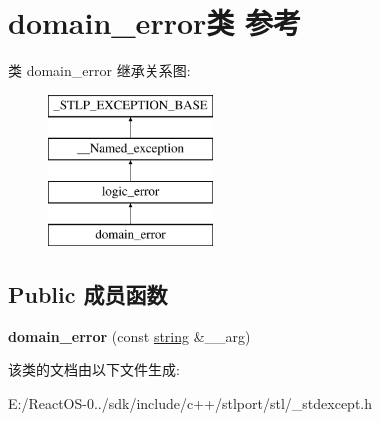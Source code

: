 \hypertarget{classdomain__error}{}\section{domain\+\_\+error类 参考}
\label{classdomain__error}
类 domain\+\_\+error 继承关系图\+:\begin{figure}[H]
\begin{center}
\leavevmode
\includegraphics[height=4.000000cm]{classdomain__error}
\end{center}
\end{figure}
\subsection*{Public 成员函数}
\begin{DoxyCompactItemize}
\item 
\mbox{\label{classdomain__error_a6a51d23265c8933bcfc5033331fc47a0}} 
{\bfseries domain\+\_\+error} (const \hyperlink{structstring}{string} \&\+\_\+\+\_\+arg)
\end{DoxyCompactItemize}


该类的文档由以下文件生成\+:\begin{DoxyCompactItemize}
\item 
E\+:/\+React\+O\+S-\/0../sdk/include/c++/stlport/stl/\+\_\+stdexcept.\+h\end{DoxyCompactItemize}
